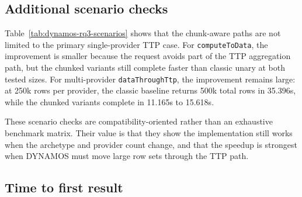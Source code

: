 \subsection{Additional scenario checks}

\begin{table}[!t]
    \centering
    \scriptsize
    \caption{Focused DYNAMOS scenario checks beyond the primary single-provider \texttt{dataThroughTtp} benchmark.}
    \label{tab:dynamos-rq3-scenarios}
    \setlength{\tabcolsep}{3pt}
\end{table}

Table~\ref{tab:dynamos-rq3-scenarios} shows that the chunk-aware paths are not limited to the primary single-provider TTP case. For \texttt{computeToData}, the improvement is smaller because the request avoids part of the TTP aggregation path, but the chunked variants still complete faster than classic unary at both tested sizes. For multi-provider \texttt{dataThroughTtp}, the improvement remains large: at 250k rows per provider, the classic baseline returns 500k total rows in 35.396s, while the chunked variants complete in 11.165s to 15.618s.

These scenario checks are compatibility-oriented rather than an exhaustive benchmark matrix. Their value is that they show the implementation still works when the archetype and provider count change, and that the speedup is strongest when DYNAMOS must move large row sets through the TTP path.

\subsection{Time to first result}

